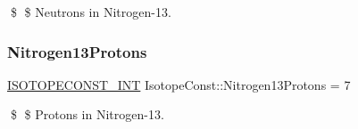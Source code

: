 \$ \$ Neutrons in Nitrogen-\/13. \mbox{\label{group___isotope_const-_nitrogen-_n13_ga9da073647320f15f982dbc55caa6a0b8}} 
\subsubsection{\texorpdfstring{Nitrogen13\+Protons}{Nitrogen13Protons}}
{\footnotesize\ttfamily \mbox{\hyperlink{group___isotope_const-_macros_ga5f18360b3e99483a35c32d789e62621c}{I\+S\+O\+T\+O\+P\+E\+C\+O\+N\+S\+T\+\_\+\+I\+NT}} Isotope\+Const\+::\+Nitrogen13\+Protons = 7}

\$ \$ Protons in Nitrogen-\/13. 
